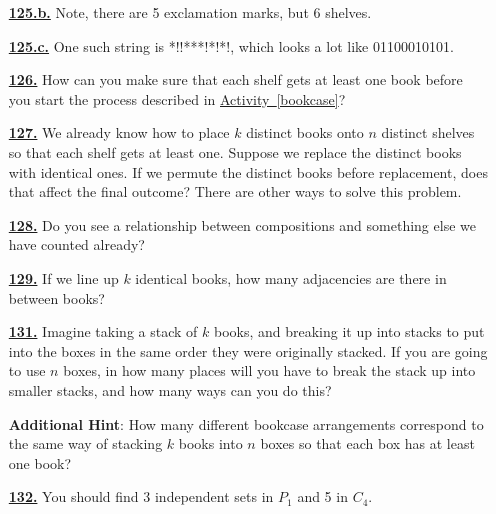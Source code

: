 \documentclass[10pt,]{book}
\theoremstyle{plain}
\theoremstyle{definition}
\theoremstyle{definition}
\theoremstyle{definition}
\numberwithin{equation}{chapter}
\begin{document}
\begin{itemize}[itemsep=1em]
\hypertarget{a-125.b}{}\item[\textbf{\hyperref[task-168]{125.b.}}]
\hypertarget{p-845}{}%
Note, there are 5 exclamation marks, but 6 shelves.%

\hypertarget{a-125.c}{}\item[\textbf{\hyperref[task-169]{125.c.}}]
\hypertarget{p-847}{}%
One such string is *!!***!*!*!, which looks a lot like 01100010101.%

\hypertarget{a-126}{}\item[\textbf{\hyperref[bookcaseeveryshelf]{126.}}]
\hypertarget{p-856}{}%
How can you make sure that each shelf gets at least one book before you start the process described in \hyperref[bookcase]{Activity~\ref{bookcase}}?%

\hypertarget{a-127}{}\item[\textbf{\hyperref[activity-120]{127.}}]
\hypertarget{p-860}{}%
We already know how to place \(k\) distinct books onto \(n\) distinct shelves so that each shelf gets at least one. Suppose we replace the distinct books with identical ones. If we permute the distinct books before replacement, does that affect the final outcome? There are other ways to solve this problem.%

\hypertarget{a-128}{}\item[\textbf{\hyperref[compositionagian]{128.}}]
\hypertarget{p-863}{}%
Do you see a relationship between compositions and something else we have counted already?%

\hypertarget{a-129}{}\item[\textbf{\hyperref[activity-122]{129.}}]
\hypertarget{p-866}{}%
If we line up \(k\) identical books, how many adjacencies are there in between books?%

\hypertarget{a-131}{}\item[\textbf{\hyperref[brokenpermutation]{131.}}]
\hypertarget{p-873}{}%
Imagine taking a stack of \(k\) books, and breaking it up into stacks to put into the boxes in the same order they were originally stacked. If you are going to use \(n\) boxes, in how many places will you have to break the stack up into smaller stacks, and how many ways can you do this?%

\par\smallskip
\noindent\textbf{Additional Hint}: \hypertarget{p-874}{}%
How many different bookcase arrangements correspond to the same way of stacking \(k\) books into \(n\) boxes so that each box has at least one book?%

\hypertarget{a-132}{}\item[\textbf{\hyperref[activity-125]{132.}}]
\hypertarget{p-885}{}%
You should find 3 independent sets in \(P_1\) and 5 in \(C_4\).%


\end{itemize}
\end{document}
